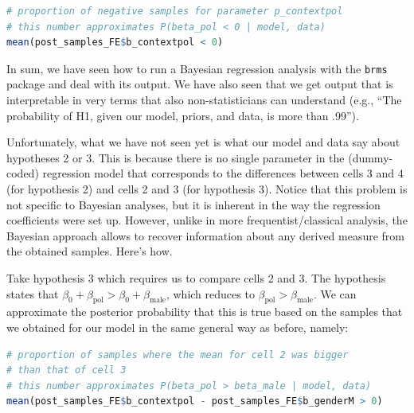 \documentclass[nobib]{tufte-handout}
\begin{document}
\begin{minipage}[]{\textwidth}
\begin{lstlisting}[language=R]
# proportion of negative samples for parameter p_contextpol
# this number approximates P(beta_pol < 0 | model, data)
mean(post_samples_FE$b_contextpol < 0)
\end{lstlisting}
\end{minipage}

In sum, we have seen how to run a Bayesian regression analysis with the \texttt{brms} package and deal with its output. We have also seen that we get output that is interpretable in very terms that also non-statisticians can understand (e.g., ``The probability of H1, given our model, priors, and data, is more than .99'').

Unfortunately, what we have not seen yet is what our model and data say about hypotheses 2 or 3. This is because there is no single parameter in the (dummy-coded) regression model that corresponds to the differences between cells 3 and 4 (for hypothesis 2) and cells 2 and 3 (for hypothesis 3). Notice that this problem is not specific to Bayesian analyses, but it is inherent in the way the regression coefficients were set up.
%
%
However, unlike in more frequentist/classical analysis, the Bayesian approach allows to recover information about any derived measure from the obtained samples. Here's how.

Take hypothesis 3 which requires us to compare cells 2 and 3. The hypothesis states that $\beta_0 + \beta_{\text{pol}} > \beta_0 + \beta_{\text{male}}$, which reduces to $\beta_{\text{pol}} > \beta_{\text{male}}$. We can approximate the posterior probability that this is true based on the samples that we obtained for our model in the same general way as before, namely:

\begin{minipage}[]{1.1\textwidth}
\begin{lstlisting}[language=R]
# proportion of samples where the mean for cell 2 was bigger 
# than that of cell 3 
# this number approximates P(beta_pol > beta_male | model, data)
mean(post_samples_FE$b_contextpol - post_samples_FE$b_genderM > 0)
\end{lstlisting}
\end{minipage}
\end{document}
